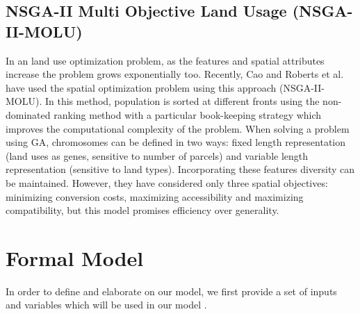 \documentclass[12pt]{article} %
\begin{document}
\subsection{ NSGA-II Multi Objective Land Usage (NSGA-II-MOLU)} In an land use optimization problem, as the features and spatial attributes increase the problem grows exponentially too. Recently, Cao and Roberts et al. have used the spatial optimization problem using this approach (NSGA-II-MOLU). In this method, population is sorted at different fronts using the non-dominated ranking method with a particular book-keeping strategy which improves the computational complexity of the problem. When solving a problem using GA, chromosomes can be defined in two ways: fixed length representation (land uses as genes, sensitive to number of parcels) and variable length representation (sensitive to land types). Incorporating these features diversity can be maintained. However, they have considered only three spatial objectives: minimizing conversion costs, maximizing accessibility and maximizing compatibility, but this model promises efficiency over generality. \\
\section{Formal Model}
In order to define and elaborate on our model, we first provide a set of inputs and variables which will be used in our model .\\
\end{document}
